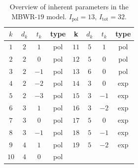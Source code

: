 \documentclass[english]{../thermomemo/thermomemo}
\numberwithin{equation}{section}
\begin{document}
\begin{table}
  \label{BenderTerms}
  \centering
  \begin{tabular}{c c c c | c c c c }
    $k$		& $d_k$		& $t_k$		& type		 & k		& $d_k$		& $t_k$		& type		   \\
    \hline
    $1$		& $2$       	&$ 1$		& pol              & $11$		& $5$       	&$ 1$		&pol                 \\
    $2$		& $2$       	&$ 0$		&pol               & $12$		& $5$       	&$ 0$		&pol                  \\
    $3$		& $2$       	&$-1$		&pol               & $13$		& $6$       	&$ 0$		&pol                  \\
    $4$		& $2$       	&$-2$ 		&pol               & $14$		& $3$       	&$ 0$		& exp              \\
    $5$		& $2$       	&$-3$ 		&pol               & $15$		& $3$       	&$-1$		& exp              \\
    $6$		& $3$       	&$ 1$		&pol               & $16$		& $3$       	&$-2$		& exp              \\
    $7$		& $3$       	&$ 0$		&pol               & $17$		& $5$       	&$ 0$		& exp              \\
    $8$		& $3$       	&$-1$		&pol               & $18$		& $5$       	&$-1$		& exp              \\
    $9$		& $4$       	&$ 1$		&pol               & $19$		& $5$       	&$-2$		& exp              \\  
    $10$	& $4$       	&$ 0$		&pol               &               &               &               &
  \end{tabular}
  \caption{Overview of inherent parameters in the MBWR-$19$ model. $I_{\mathrm{pol}}=13$, $I_{\mathrm{tot}}=32$.}
\end{table}
\end{document}

